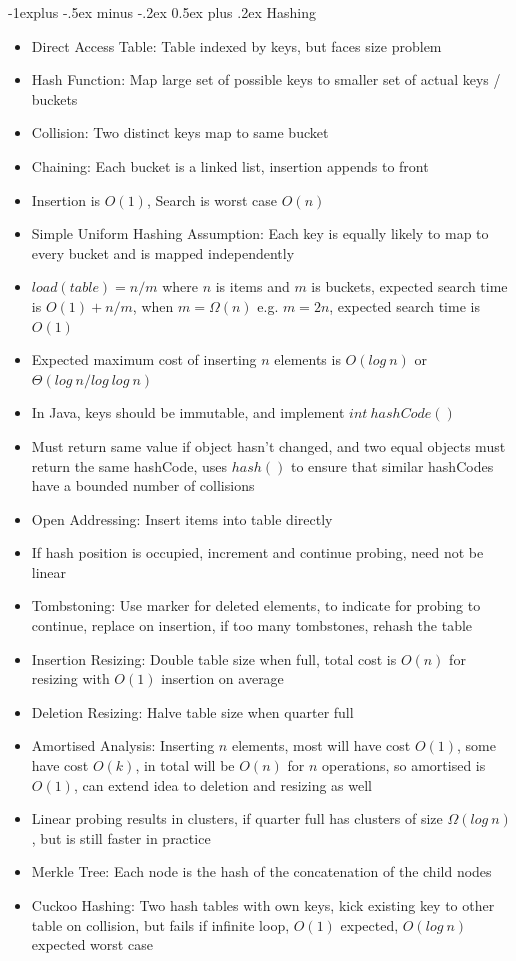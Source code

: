 \documentclass[10pt, landscape]{article}
\makeatletter
\renewcommand{\section}{\@startsection{section}{1}{0mm}%
                                {-1ex plus -.5ex minus -.2ex}%
                                {0.5ex plus .2ex}%
                                {\normalfont\large\bfseries}}
\renewcommand{\section}{\@startsection{section}{2}{0mm}%
                                {-1explus -.5ex minus -.2ex}%
                                {0.5ex plus .2ex}%
                                {\normalfont\normalsize\bfseries}}
\makeatother
\begin{document}
\begin{multicols*}{4}
\section{Hashing}
\begin{itemize}
    \item Direct Access Table: Table indexed by keys, but faces size problem
    \item Hash Function: Map large set of possible keys to smaller set of actual keys / buckets
    \item Collision: Two distinct keys map to same bucket
    \item Chaining: Each bucket is a linked list, insertion appends to front
    \item Insertion is $O(1)$, Search is worst case $O(n)$
    \item Simple Uniform Hashing Assumption: Each key is equally likely to map to every bucket and is mapped independently
    \item $load(table)=n/m$ where $n$ is items and $m$ is buckets, expected search time is $O(1)+n/m$, when $m=\Omega(n)$ e.g. $m=2n$, expected search time is $O(1)$
    \item Expected maximum cost of inserting $n$ elements is $O(log\ n)$ or $\Theta(log \ n/log\ log\ n)$
    \item In Java, keys should be immutable, and implement $int\ hashCode()$
    \item Must return same value if object hasn't changed, and two equal objects must return the same hashCode, uses $hash()$ to ensure that similar hashCodes have a bounded number of collisions
    \item Open Addressing: Insert items into table directly
    \item If hash position is occupied, increment and continue probing, need not be linear
    \item Tombstoning: Use marker for deleted elements, to indicate for probing to continue, replace on insertion, if too many tombstones, rehash the table
    \item Insertion Resizing: Double table size when full, total cost is $O(n)$ for resizing with $O(1)$ insertion on average
    \item Deletion Resizing: Halve table size when quarter full
    \item Amortised Analysis: Inserting $n$ elements, most will have cost $O(1)$, some have cost $O(k)$, in total will be $O(n)$ for $n$ operations, so amortised is $O(1)$, can extend idea to deletion and resizing as well
    \item Linear probing results in clusters, if quarter full has clusters of size $\Omega(log \ n)$, but is still faster in practice
    \item Merkle Tree: Each node is the hash of the concatenation of the child nodes
    \item Cuckoo Hashing: Two hash tables with own keys, kick existing key to other table on collision, but fails if infinite loop, $O(1)$ expected, $O(log \ n)$ expected worst case
\end{itemize}


\end{multicols*}
\end{document}
